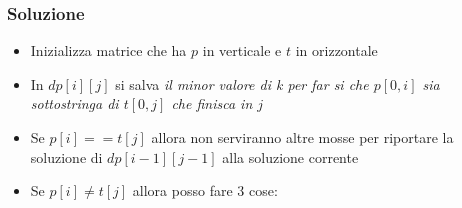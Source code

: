 \subsubsection{Soluzione}
\begin{itemize}
	\item Inizializza matrice che ha $ p $ in verticale e $ t $ in orizzontale
	\item In $ dp\left[i\right]\left[j\right] $ si salva \textit{il minor valore di k per far si che $ p\left[0, i\right] $ sia sottostringa di $ t\left[0, j\right] $ che finisca in $ j $}
	\item Se $ p\left[i\right] == t\left[j\right] $ allora non serviranno altre mosse per riportare la soluzione di $ dp\left[i-1\right]\left[j-1\right] $ alla soluzione corrente
	\item Se $ p\left[i\right] \neq  t\left[j\right] $  allora posso fare 3 cose:
\end{itemize}

